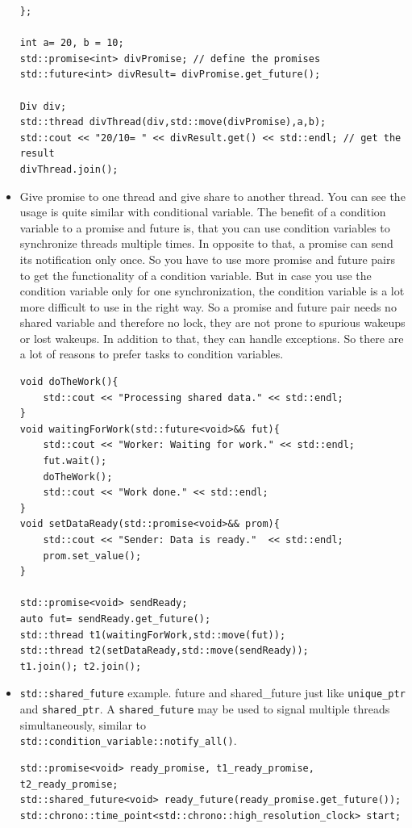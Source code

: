 \documentclass[a4paper,11pt,twoside]{book}
\begin{document}
\begin{itemize}
\begin{lstlisting}[numbers=none]
};

int a= 20, b = 10;
std::promise<int> divPromise; // define the promises
std::future<int> divResult= divPromise.get_future();

Div div;
std::thread divThread(div,std::move(divPromise),a,b);
std::cout << "20/10= " << divResult.get() << std::endl; // get the result
divThread.join();
\end{lstlisting}

	\item Give promise to one thread and give share to another thread. You can see the usage is quite similar with conditional variable. The benefit of a condition variable to a promise and future is, that you can use condition variables to synchronize threads multiple times. In opposite to that, a promise can send its notification only once. So you have to use more promise and future pairs to get the functionality of a condition variable. But in case you use the condition variable only for one synchronization, the condition variable is a lot more difficult to use in the right way. So a promise and future pair needs no shared variable and therefore no lock, they are not prone to spurious wakeups or lost wakeups. In addition to that, they can handle exceptions. So there are a lot of reasons to prefer tasks to condition variables.
\begin{lstlisting}[numbers=none]
void doTheWork(){
	std::cout << "Processing shared data." << std::endl;
}
void waitingForWork(std::future<void>&& fut){
	std::cout << "Worker: Waiting for work." << std::endl;
	fut.wait();
	doTheWork();
	std::cout << "Work done." << std::endl;
}
void setDataReady(std::promise<void>&& prom){
	std::cout << "Sender: Data is ready."  << std::endl;
	prom.set_value();	
}

std::promise<void> sendReady;
auto fut= sendReady.get_future();
std::thread t1(waitingForWork,std::move(fut));
std::thread t2(setDataReady,std::move(sendReady));
t1.join(); t2.join();	
\end{lstlisting}

    
    \item \texttt{std::shared\_future} example. future and shared\_future just like \texttt{unique\_ptr} and \texttt{shared\_ptr}. A \texttt{shared\_future} may be used to signal multiple threads simultaneously, similar to \\
\texttt{std::condition\_variable::notify\_all()}.

\begin{lstlisting}[numbers=none]  
std::promise<void> ready_promise, t1_ready_promise, t2_ready_promise;
std::shared_future<void> ready_future(ready_promise.get_future());
std::chrono::time_point<std::chrono::high_resolution_clock> start;


\end{lstlisting}
\end{itemize}
\end{document}
